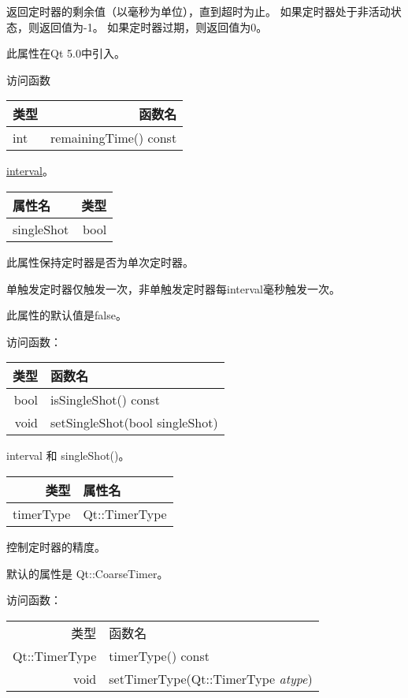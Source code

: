 返回定时器的剩余值（以毫秒为单位），直到超时为止。 如果定时器处于非活动状态，则返回值为-1。 如果定时器过期，则返回值为0。

此属性在Qt 5.0中引入。

访问函数

\begin{tabular}{|l|r|}
\hline
类型 & 函数名 \\ 
\hline
int	& remainingTime() const \\
\hline
\end{tabular}


\begin{notice}[另请参阅]
\href{https://github.com/JackLovel/QtDocumentCN/blob/master/Src/T/QTimer/qtimer.html#interval-prop}{interval}。
\end{notice}


\begin{tabular}{|l|r|}
\hline
属性名 & 类型 \\ 
\hline
singleShot &	bool \\
\hline
\end{tabular}


此属性保持定时器是否为单次定时器。

单触发定时器仅触发一次，非单触发定时器每interval毫秒触发一次。

此属性的默认值是false。

访问函数：

\begin{tabular}{|r|l|}
\hline
类型 & 	函数名 \\ 
\hline
bool &	isSingleShot() const \\ 
\hline
void	 & setSingleShot(bool singleShot) \\
\hline
\end{tabular}


\begin{notice}[另请参阅]
interval 和 singleShot()。
\end{notice}

\begin{tabular}{|r|l|}
\hline
类型	 & 属性名 \\ 
\hline
timerType	 & Qt::TimerType \\ 
\hline
\end{tabular}

控制定时器的精度。

默认的属性是 Qt::CoarseTimer。

访问函数：

\begin{tabular}{|r|l|}
\hline
类型	 & 函数名 \\ 
Qt::TimerType & 	timerType() const \\ 
void	 & setTimerType(Qt::TimerType \emph{atype}) \\ 
\hline
\end{tabular}

